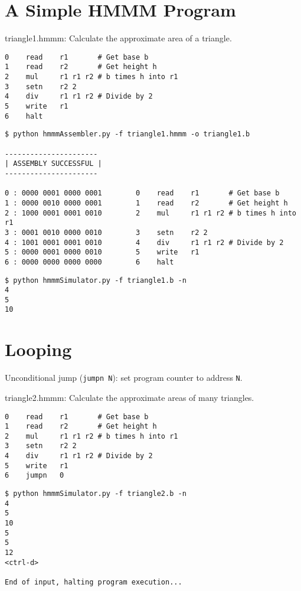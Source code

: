 \documentclass[8pt,a4paper,compress,handout]{beamer}
\begin{document}
\section{A Simple HMMM Program}

\begin{frame}[fragile]
\begin{framed}
\tiny triangle1.hmmm: Calculate the approximate area of a triangle.
\end{framed}

\begin{lstlisting}[language={}]
0    read    r1       # Get base b
1    read    r2       # Get height h
2    mul     r1 r1 r2 # b times h into r1
3    setn    r2 2
4    div     r1 r1 r2 # Divide by 2
5    write   r1
6    halt
\end{lstlisting}

\begin{lstlisting}[language={}]
$ python hmmmAssembler.py -f triangle1.hmmm -o triangle1.b

----------------------
| ASSEMBLY SUCCESSFUL |
----------------------

0 : 0000 0001 0000 0001        0    read    r1       # Get base b
1 : 0000 0010 0000 0001        1    read    r2       # Get height h
2 : 1000 0001 0001 0010        2    mul     r1 r1 r2 # b times h into r1
3 : 0001 0010 0000 0010        3    setn    r2 2
4 : 1001 0001 0001 0010        4    div     r1 r1 r2 # Divide by 2
5 : 0000 0001 0000 0010        5    write   r1
6 : 0000 0000 0000 0000        6    halt
\end{lstlisting}

\begin{lstlisting}[language={}]
$ python hmmmSimulator.py -f triangle1.b -n
4
5
10
\end{lstlisting}
\end{frame}

\section{Looping}
\begin{frame}[fragile]

Unconditional jump (\lstinline{jumpn N}): set program counter to address \lstinline{N}.

\bigskip

\begin{framed}
\tiny triangle2.hmmm: Calculate the approximate areas of many triangles.
\end{framed}

\begin{lstlisting}[language={}]
0    read    r1       # Get base b
1    read    r2       # Get height h
2    mul     r1 r1 r2 # b times h into r1
3    setn    r2 2
4    div     r1 r1 r2 # Divide by 2
5    write   r1
6    jumpn   0
\end{lstlisting}

\begin{lstlisting}[language={}]
$ python hmmmSimulator.py -f triangle2.b -n
4
5
10
5
5
12
<ctrl-d>

End of input, halting program execution...
\end{lstlisting}
\end{frame}
\end{document}
